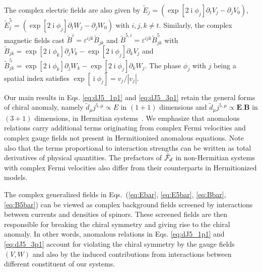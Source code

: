 \documentclass[prl,aps,showpacs,twocolumn,preprintnumbers,
amsmath,amssymb,superscriptaddress,longbibliography]{revtex4-1}
\renewcommand{\i}{\mathop{\mathrm{i}}}
\newcommand{\bolds}[1]{\boldsymbol #1}
\begin{document}
The complex electric fields are also given by $\tilde{E}_{j}= (\exp[2 \i \phi_{j} ] \partial_{t} V_{j} -  \partial_{j} V_{0})$, $\tilde{E}^{5}_{j}= (\exp[2 \i \phi_{j} ] \partial_{t} W_{j} -  \partial_{j} W_{0})$ with $i,j,k \neq t$. Similarly, the complex magnetic fields cast $\tilde{B}^{i} =\varepsilon^{ijk}\tilde{B}_{jk}$ and  $\tilde{B}^{5,i} =\varepsilon^{ijk} \tilde{B}_{jk}^{5}$ with $\tilde{B}_{jk}= \exp[2 \i \phi_{k}] \partial_{j} V_{k} -\exp[2 \i \phi_{j}]  \partial_{k} V_{j} $ and $\tilde{B}_{jk}^{5}= \exp[2 \i \phi_{k}] \partial_{j} W_{k} -\exp[2 \i \phi_{j}]  \partial_{k} W_{j}$. The phase $\phi_{j}$ with $j$ being a spatial index satisfies $\exp[\i \phi_{j}]=v_{j}/ |v_{j}|$. 

Our main results in Eqs. \eqref{eq:dJ5_1p1} and \eqref{eq:dJ5_3p1} retain the general forms of chiral anomaly, namely $\tilde{d}_{\mu}j^{5,\mu} \propto E$ in $(1+1)$ dimensions and $\tilde{d}_{\mu}j^{5,\mu} \propto \bolds{E}. \bolds{B}$ in $(3+1)$ dimensions, in Hermitian systems~\cite{Fujikawa1979, Bertlmann1996, Rylands2021, Parhizkar2023}. We emphasize that anomalous relations carry additional terms originating from complex Fermi velocities and complex gauge fields not present in Hermitionized anomalous equations. Note also that the terms proportional to interaction strengths can be written as total derivatives of physical quantities. The prefactors of $\tilde{\cal F}_{d}$ in non-Hermitian systems with complex Fermi velocities also differ from their counterparts in Hermitionized models.

The complex generalized fields in Eqs.~(\ref{eq:Ebar}, \ref{eq:E5bar}, \ref{eq:Bbar}, \ref{eq:B5bar}) can be viewed as complex background fields screened by interactions between currents and densities of spinors. These screened fields are then responsible for breaking the chiral symmetry and giving rise to the chiral anomaly. In other words, anomalous relations in Eqs. \eqref{eq:dJ5_1p1} and \eqref{eq:dJ5_3p1} account for violating the chiral symmetry by the gauge fields $(V, W)$ and also by the induced contributions from interactions between different constituent of our systems.
\end{document}
